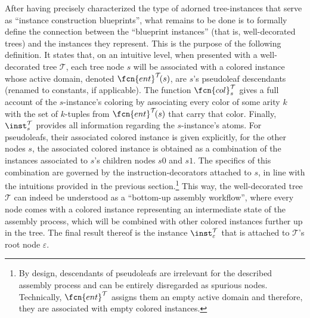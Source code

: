 
After having precisely characterized the type of adorned tree-instances that serve as ``instance construction blueprints'', what remains to be done is to formally define the connection between the ``blueprint instances'' (that is, well-decorated trees) and the instances they represent. This is the purpose of the following definition. It states that, on an intuitive level, when presented with a well-decorated tree $\mathcal{T}$, each tree node $s$ will be associated with a colored instance whose active domain, denoted $\fcn{ent}^\mathcal{T}\!(s)$, are $s$'s pseudoleaf descendants (renamed to constants, if applicable). The function $\fcn{col}^{\mathcal{T}}_s$ gives a full account of the $s$-instance's coloring by associating every color of some arity $k$ with the set of $k$-tuples from $\fcn{ent}^\mathcal{T}\!(s)$ that carry that color. Finally, $\inst^{\mathcal{T}}_s$ provides all information regarding the $s$-instance's atoms. For pseudoleafs, their associated colored instance is given explicitly, for the other nodes $s$, the associated colored instance is obtained as a combination of the instances associated to $s$'s children nodes $s0$ and $s1$. The specifics of this combination are governed by the instruction-decorators attached to $s$, in line with the intuitions provided in the previous section.\footnote{By design, descendants of pseudoleafs are irrelevant for the described assembly process and can be entirely disregarded as spurious nodes. Technically, $\fcn{ent}^\mathcal{T}$ assigns them an empty active domain and therefore, they are associated with empty colored instances.} This way, the well-decorated tree $\mathcal{T}$ can indeed be understood as a ``bottom-up assembly workflow'', where every node comes with a colored instance representing an intermediate state of the assembly process, which will be combined with other colored instances further up in the tree. The final result thereof is the instance $\inst^{\mathcal{T}}_\varepsilon$ that is attached to $\mathcal{T}$'s root node $\varepsilon$.    

